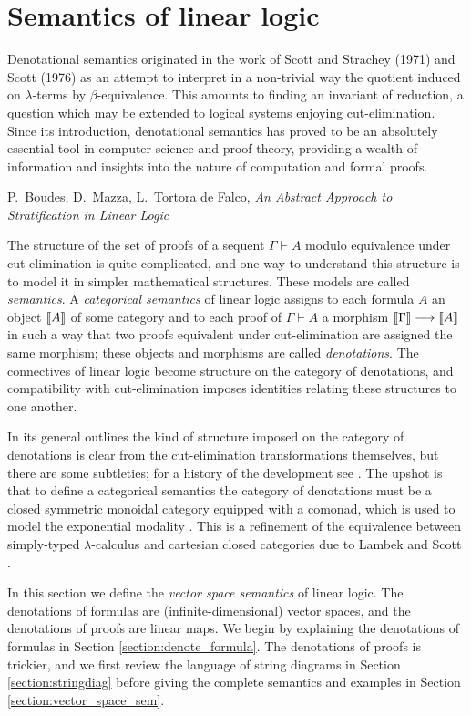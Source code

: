 \documentclass[english,letter paper,12pt,reqno]{article}
\theoremstyle{example}
\numberwithin{equation}{section}
\begin{document}
\section{Semantics of linear logic}\label{section:diagrammatics}

\setlength{\epigraphwidth}{0.8\textwidth}
\epigraph{Denotational semantics originated in the work of Scott and Strachey (1971) and Scott (1976) as an attempt to interpret in a non-trivial way the quotient induced on $\lambda$-terms by $\beta$-equivalence. This amounts to finding an invariant of reduction, a question which may be extended to logical systems enjoying cut-elimination. Since its introduction, denotational semantics has proved to be an absolutely essential tool in computer science and proof theory, providing a wealth of information and insights into the nature of computation and formal proofs.}{P.~Boudes, D.~Mazza, L.~Tortora de Falco, \textit{An Abstract Approach to Stratification in Linear Logic}}

The structure of the set of proofs of a sequent $\Gamma \vdash A$ modulo equivalence under cut-elimination is quite complicated, and one way to understand this structure is to model it in simpler mathematical structures. These models are called \emph{semantics}. A \emph{categorical semantics} of linear logic \cite{mellies, blue_book} assigns to each formula $A$ an object $\llbracket A \rrbracket$ of some category and to each proof of $\Gamma \vdash A$ a morphism $\llbracket \Gamma \rrbracket \longrightarrow \llbracket A \rrbracket$ in such a way that two proofs equivalent under cut-elimination are assigned the same morphism; these objects and morphisms are called \emph{denotations}. The connectives of linear logic become structure on the category of denotations, and compatibility with cut-elimination imposes identities relating these structures to one another.

In its general outlines the kind of structure imposed on the category of denotations is clear from the cut-elimination transformations themselves, but there are some subtleties; for a history of the development see \cite{mellies}. The upshot is that to define a categorical semantics the category of denotations must be a closed symmetric monoidal category equipped with a comonad, which is used to model the exponential modality \cite[\S 7]{mellies}. This is a refinement of the equivalence between simply-typed $\lambda$-calculus and cartesian closed categories due to Lambek and Scott \cite{lambek}. 

In this section we define the \textsl{vector space semantics} of linear logic. The denotations of formulas are (infinite-dimensional) vector spaces, and the denotations of proofs are linear maps. We begin by explaining the denotations of formulas in Section \ref{section:denote_formula}. The denotations of proofs is trickier, and we first review the language of string diagrams in Section \ref{section:stringdiag} before giving the complete semantics and examples in Section \ref{section:vector_space_sem}.
\end{document}
